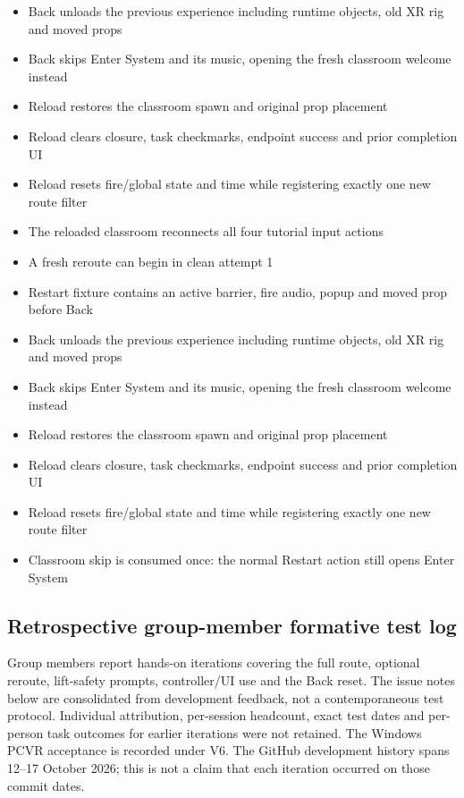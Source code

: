 \documentclass[12pt,a4paper]{article}
\begin{document}
\begin{itemize}[leftmargin=*,nosep]
\item Back unloads the previous experience including runtime objects, old XR rig and moved props
\item Back skips Enter System and its music, opening the fresh classroom welcome instead
\item Reload restores the classroom spawn and original prop placement
\item Reload clears closure, task checkmarks, endpoint success and prior completion UI
\item Reload resets fire/global state and time while registering exactly one new route filter
\item The reloaded classroom reconnects all four tutorial input actions
\item A fresh reroute can begin in clean attempt 1
\item Restart fixture contains an active barrier, fire audio, popup and moved prop before Back
\item Back unloads the previous experience including runtime objects, old XR rig and moved props
\item Back skips Enter System and its music, opening the fresh classroom welcome instead
\item Reload restores the classroom spawn and original prop placement
\item Reload clears closure, task checkmarks, endpoint success and prior completion UI
\item Reload resets fire/global state and time while registering exactly one new route filter
\item Classroom skip is consumed once: the normal Restart action still opens Enter System
\end{itemize}
\endgroup

\subsection{Retrospective group-member formative test log}
Group members report hands-on iterations covering the full route, optional
reroute, lift-safety prompts, controller/UI use and the Back reset. The issue
notes below are consolidated from development feedback, not a contemporaneous
test protocol. Individual attribution, per-session headcount, exact test
dates and per-person task outcomes for earlier iterations were not retained.
The Windows PCVR acceptance is recorded under V6. The GitHub development
history spans 12--17 October 2026; this is not a claim that each iteration
occurred on those commit dates.
\end{document}

